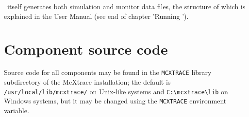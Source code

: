 %
%

\MCX\ itself generates both simulation and monitor data files, the structure of which is explained in the User Manual (see end of chapter 'Running \MCX').

\section{Component source code}
Source code for all components may be found in the \verb+MCXTRACE+ library
subdirectory of the McXtrace installation;
the default is \verb+/usr/local/lib/mcxtrace/+
on Unix-like systems and \verb+C:\mcxtrace\lib+ on Windows systems, but it may be
changed using the \verb+MCXTRACE+ environment variable.


